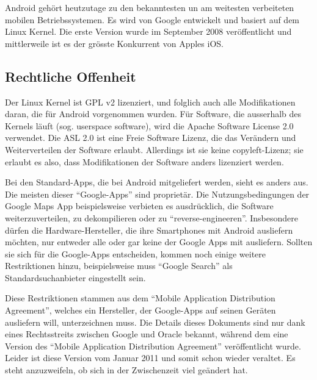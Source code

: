 Android gehört heutzutage zu den bekanntesten un am weitesten verbeiteten mobilen Betriebssystemen. Es wird von Google entwickelt und basiert auf dem Linux Kernel. Die erste Version wurde im September 2008 veröffentlicht und mittlerweile ist es der grösste Konkurrent von Apples iOS. \\

\subsection{Rechtliche Offenheit}
Der Linux Kernel ist GPL v2 lizenziert\thinspace\cite{online:kernel-license}, und folglich auch alle Modifikationen daran, die für Android vorgenommen wurden. Für Software, die ausserhalb des Kernels läuft (sog. userspace software), wird die Apache Software License 2.0 verwendet\thinspace\cite{online:android-licenses}. Die ASL 2.0 ist eine Freie Software Lizenz, die das Verändern und Weiterverteilen der Software erlaubt. Allerdings ist sie  keine copyleft-Lizenz; sie erlaubt es also, dass Modifikationen der Software anders lizenziert werden\thinspace\cite{online:apache-license}.

Bei den Standard-Apps, die bei Android mitgeliefert werden, sieht es anders aus. Die meisten dieser ``Google-Apps'' sind proprietär. Die Nutzungsbedingungen der Google Maps App beispielsweise verbieten es ausdrücklich, die Software weiterzuverteilen, zu dekompilieren oder zu ``reverse-engineeren''\thinspace\cite{online:google-maps-tos}. Insbesondere dürfen die Hardware-Hersteller, die ihre Smartphones mit Android ausliefern möchten, nur entweder alle oder gar keine der Google Apps mit ausliefern. Sollten sie sich für die Google-Apps entscheiden, kommen noch einige weitere Restriktionen hinzu, beispielsweise muss ``Google Search'' als Standardsuchanbieter eingestellt sein\thinspace\cite{online:mada-leak}.

Diese Restriktionen stammen aus dem ``Mobile Application Distribution Agreement'', welches ein Hersteller, der Google-Apps auf seinen Geräten ausliefern will, unterzeichnen muss. Die Details dieses Dokuments sind nur dank eines Rechtsstreits zwischen Google und Oracle bekannt, während dem eine Version des ``Mobile Application Distribution Agreement'' veröffentlicht wurde\thinspace\cite{online:ars-mada-leak}. Leider ist diese Version vom Januar 2011 und somit schon wieder veraltet. Es steht anzuzweifeln, ob sich in der Zwischenzeit viel geändert hat. \\

